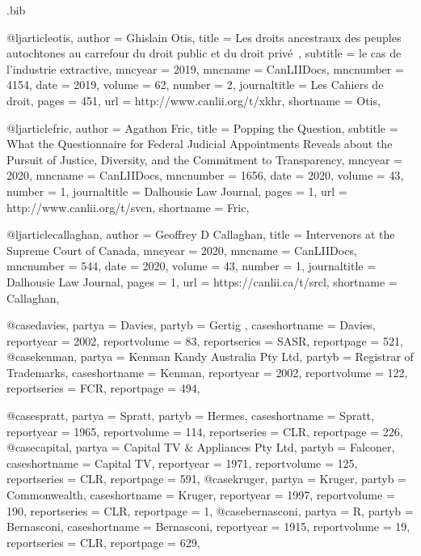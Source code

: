 

\begin{filecontents*}[overwrite]{\jobname.bib}

@ljarticle{otis,	author =  {Ghislain Otis},	title =  {Les droits ancestraux des peuples autochtones au carrefour du droit public et du droit privé~},	subtitle =  {le cas de l’industrie extractive},	mncyear =  {2019},	mncname =  {CanLIIDocs},	mncnumber =  {4154},	date =  {2019},	volume =  {62},	number =  {2},	journaltitle =  {Les Cahiers de droit},	pages =  {451},	url =  {http://www.canlii.org/t/xkhr},	shortname =  {Otis},		}

@ljarticle{fric,	author =  {Agathon Fric},	title =  {Popping the Question},	subtitle =  {What the Questionnaire for Federal Judicial Appointments Reveals about the Pursuit of Justice, Diversity, and the Commitment to Transparency},	mncyear =  {2020},	mncname =  {CanLIIDocs},	mncnumber =  {1656},	date =  {2020},	volume =  {43},	number =  {1},	journaltitle =  {Dalhousie Law Journal},	pages =  {1},	url =  {http://www.canlii.org/t/svcn},	shortname =  {Fric},		}


@ljarticle{callaghan,	author =  {Geoffrey D Callaghan},	title =  {Intervenors at the Supreme Court of Canada},		mncyear =  {2020},	mncname =  {CanLIIDocs},	mncnumber =  {544},	date =  {2020},	volume =  {43},	number =  {1},	journaltitle =  {Dalhousie Law Journal},	pages =  {1},	url =  {https://canlii.ca/t/srcl},		shortname =  {Callaghan},	}


@case{davies,	partya =  {Davies},	partyb =  {Gertig },	caseshortname =  {Davies},	reportyear =  {2002},	reportvolume =  {83},		reportseries =  {SASR},	reportpage =  {521},		}
@case{kenman,	partya =  {Kenman Kandy Australia Pty Ltd},	partyb =  {Registrar of Trademarks},	caseshortname =  {Kenman},	reportyear =  {2002},	reportvolume =  {122},		reportseries =  {FCR},	reportpage =  {494},		}

@case{spratt,	partya =  {Spratt},	partyb =  {Hermes},	caseshortname =  {Spratt},	reportyear =  {1965},	reportvolume =  {114},		reportseries =  {CLR},	reportpage =  {226},		}
@case{capital,	partya =  {Capital TV \& Appliances Pty Ltd},	partyb =  {Falconer},	caseshortname =  {Capital TV},	reportyear =  {1971},	reportvolume =  {125},		reportseries =  {CLR},	reportpage =  {591},		}
@case{kruger,	partya =  {Kruger},	partyb =  {Commonwealth},	caseshortname =  {Kruger},	reportyear =  {1997},	reportvolume =  {190},		reportseries =  {CLR},	reportpage =  {1},		}
@case{bernasconi,	partya =  {R},	partyb =  {Bernasconi},	caseshortname =  {Bernasconi},	reportyear =  {1915},	reportvolume =  {19},		reportseries =  {CLR},	reportpage =  {629},		}



\end{filecontents*}
